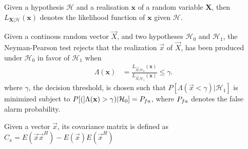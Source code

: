 \documentclass[a4paper, openany, oneside]{memoir}
\begin{document}
\begin{blockDefinition}
Given a hypothesis $\mathcal{H}$ and a realisation $\mathbf{x}$ of a random variable $\mathbf{X}$, then $L_{\mathbf{X} | \mathcal{H}}(\mathbf{x})$ denotes the likelihood function of $\mathbf{x}$ given $\mathcal{H}$.
\end{blockDefinition}

\begin{blockDefinition}
Given a continous random vector $\vec{X}$, and two hypotheses $\mathcal{H}_0$ and $\mathcal{H}_1$, the Neyman-Pearson test rejects that the realization $\vec{x}$ of $\vec{X}$, has been produced under $\mathcal{H}_0$ in favor of $\mathcal{H}_1$
when
\begin{align*}
    \Lambda (\mathbf{x}) &= \frac{L_{\vec{X} | \mathcal{H}_0} (\mathbf{x})}{L_{\vec{X} | \mathcal{H}_1}(\mathbf{x})} \leq \gamma.
\end{align*}
where $\gamma$, the decision threshold, is chosen such that $P[\Lambda(\vec{x} < \gamma) | \mathcal{H}_1]$ is minimized subject to $P[(]\Lambda(\vec{x}) > \gamma) | \mathcal{H}_0] = P\ss{fa}$, where $P\ss{fa}$ denotes the false alarm probability. %
\end{blockDefinition}

\clearpage
\begin{blockDefinition}
Given a vector $\vec{x}$, its covariance matrix is defined as $C_{x} = E(\vec{x}\vec{x}^H)-E(\vec{x})E(\vec{x}^H)$
\end{blockDefinition}
\end{document}
